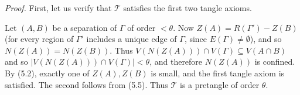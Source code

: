 \textit{Proof.} First, let us verify that $\mathscr{T}$ satisfies the first two tangle axioms.

Let $(A, B)$ be a separation of $\Gamma$ of order $< \theta$. Now $Z(A) = R(\Gamma') - Z(B)$ (for every region of $\Gamma'$ includes a unique edge of $\Gamma$, since $E(\Gamma) \ne \emptyset$), and so $N(Z(A)) = N(Z(B))$. Thus $V(N(Z(A))) \cap V(\Gamma) \subseteq V(A \cap B)$ and so $|V(N(Z(A))) \cap V(\Gamma)| < \theta$, and therefore $N(Z(A))$ is confined. By (5.2), exactly one of $Z(A), Z(B)$ is small, and the first tangle axiom is satisfied. The second follows from (5.5). Thus $\mathscr{T}$ is a pretangle of order $\theta$.
